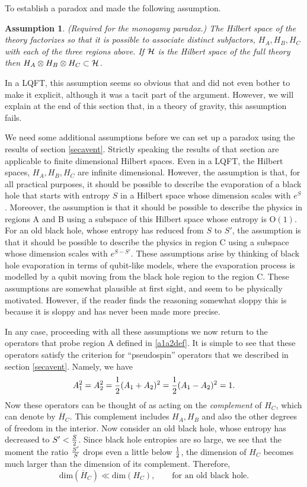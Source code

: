\documentclass[12pt]{article}
\def\hilbfull{{\cal H}}
\def\Or[#1]{{\text{O}}\left({#1}\right)}
\newcommand{\be}{\begin{equation}}
\newcommand{\ee}{\end{equation}}
\newtheorem*{wrongassumption}{Assumption}
\begin{document}
To establish a paradox \cite{Mathur:2009hf} and \cite{Almheiri:2012rt} made the following assumption.
\begin{wrongassumption}{(Required for the monogamy paradox.)}
The Hilbert space of the theory
factorizes so that it is possible to associate distinct subfactors, $H_{A}, H_{B}, H_{C}$ with each of the three regions above. If $\hilbfull$ is the Hilbert space of the full theory then $H_{A} \otimes H_{B} \otimes H_{C} \subset \hilbfull$.
\end{wrongassumption}
In a LQFT, this assumption seems so obvious  that  \cite{Mathur:2009hf} and \cite{Almheiri:2012rt} did not even bother to make it explicit, although it was a tacit part of the argument. However, we will explain at the end of this section that, in a theory of gravity, this assumption fails. 


We need some additional assumptions before we can set up a paradox using the results of section \ref{secavent}. Strictly speaking the results of that section are applicable to finite dimensional Hilbert spaces. Even in a LQFT, the Hilbert spaces, $H_{A}, H_{B}, H_{C}$ are infinite dimensional. However, the assumption is that, for all practical purposes, it should be possible to describe the evaporation of a black hole that starts with entropy $S$ in a Hilbert space whose dimension scales with $e^{S}$. Moreover, the assumption is that it should be possible to describe the physics in regions A and B using a subspace of this Hilbert space whose entropy is $\Or[1]$. For an old black hole, whose entropy has reduced from $S$ to $S'$, the assumption is that it should be possible to describe the physics in region C using a subspace whose dimension scales with $e^{S - S'}$. These assumptions arise
by thinking of black hole evaporation in terms of qubit-like models, where the evaporation process is modelled by
a qubit moving from the black hole region to the region C. These assumptions are somewhat plausible at first sight, and seem to be physically motivated. However, if the reader finds the reasoning somewhat sloppy this is because it is sloppy and has never been made more precise. 

In any case, proceeding with all these assumptions we now return to the operators that probe region A defined in \eqref{a1a2def}.  It is simple to see that these operators satisfy the criterion for ``pseudospin'' operators that we described in section \ref{secavent}. Namely, we have 
\be
A_1^2 = A_2^2 = {1 \over 2} (A_1 + A_2)^2 = {1 \over 2} (A_1 - A_2)^2 = 1.
\ee
Now these operators can be thought of as acting on the {\em complement} of $H_{C}$, which can denote by $\overline{H}_C$.  This complement includes $H_{A}, H_{B}$ and also the other degrees of freedom in the interior. Now consider an  old black hole, whose entropy has decreased to $S' < {S \over 2}$. Since black hole entropies are so large, we see that the moment the ratio ${S' \over S}$ drops even a little below ${1 \over 2}$,   the dimension of $H_{C}$ becomes much larger than the dimension of its complement. Therefore,
\be
\text{dim}(\overline{H}_C) \ll \text{dim}(H_C), \qquad \text{for~an~old~black~hole}.
\ee
\end{document}
